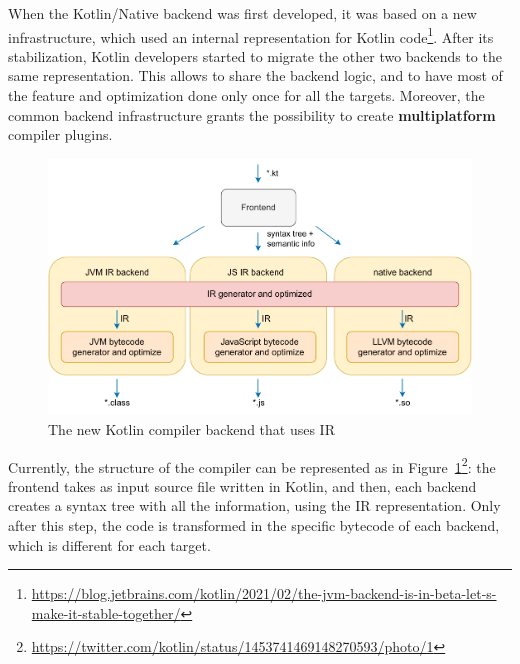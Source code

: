 When the Kotlin/Native backend was first developed, it was based on a new infrastructure, which used an internal representation for Kotlin code\footnote{\url{https://blog.jetbrains.com/kotlin/2021/02/the-jvm-backend-is-in-beta-let-s-make-it-stable-together/}}. After its stabilization, Kotlin developers started to migrate the other two backends to the same representation. This allows to share the backend logic, and to have most of the feature and optimization done only once for all the targets. Moreover, the common backend infrastructure grants the possibility to create \textbf{multiplatform} compiler plugins.

\begin{figure}[!ht]
    \centering
    \includegraphics[scale=0.9]{document/chapters/2-metaprogramming/images/kotlin_compiler_plugin_ir_representation.pdf}
    \caption{The new Kotlin compiler backend that uses IR}
    \label{fig:kotlin_compiler_plugin_ir_representation}
\end{figure}

Currently, the structure of the compiler can be represented as in Figure~\ref{fig:kotlin_compiler_plugin_ir_representation}\footnote{\url{https://twitter.com/kotlin/status/1453741469148270593/photo/1}}: the frontend takes as input source file written in Kotlin, and then, each backend creates a syntax tree with all the information, using the IR representation. Only after this step, the code is transformed in the specific bytecode of each backend, which is different for each target.

